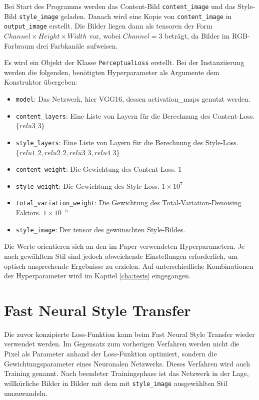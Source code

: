Bei Start des Programms werden das Content-Bild \texttt{content_image} und das Style-Bild \texttt{style_image} geladen. Danach wird eine Kopie von \texttt{content_image} in \texttt{output_image} erstellt. Die Bilder liegen dann als \gls{tensor}en der Form $ Channel \times Height \times Width $ vor, wobei $ Channel = 3 $ beträgt, da Bilder im RGB-Farbraum drei Farbkanäle aufweisen.

Es wird ein Objekt der Klasse \texttt{PerceptualLoss} erstellt. Bei der Instanziierung werden die folgenden, benötigten Hyperparameter als Argumente dem Konstruktor übergeben:

\begin{itemize}
	\item \texttt{model}: Das Netzwerk, hier VGG16, dessen \gls{activation_map}s genutzt werden.
	\item \texttt{content_layers}: Eine Liste von Layern für die Berechnung des Content-Loss.\\ $ \{ relu3\_3 \} $
	\item \texttt{style_layers}: Eine Liste von Layern für die Berechnung des Style-Loss.\\ $ \{ relu1\_2, relu2\_2, relu3\_3, relu4\_3 \} $
	\item \texttt{content_weight}: Die Gewichtung des Content-Loss. $ 1 $ 
	\item \texttt{style_weight}: Die Gewichtung des Style-Loss. $ 1 \times 10^{7} $
	\item \texttt{total_variation_weight}: Die Gewichtung des Total-Variation-Denoising Faktors. $ 1 \times 10^{-5} $
	\item \texttt{style_image}: Der \gls{tensor} des gewünschten Style-Bildes.
\end{itemize}

Die Werte orientieren sich an den im Paper \cite{DBLP:journals/corr/JohnsonAL16} verwendeten Hyperparametern. Je nach gewähltem Stil sind jedoch abweichende Einstellungen erforderlich, um optisch ansprechende Ergebnisse zu erzielen. Auf unterschiedliche Kombinationen der Hyperparameter wird im Kapitel \ref{cha:tests} eingegangen.

\section{Fast Neural Style Transfer}

Die zuvor konzipierte Loss-Funktion kann beim Fast Neural Style Transfer wieder verwendet werden. 
Im Gegensatz zum vorherigen Verfahren werden nicht die Pixel als Parameter anhand der Loss-Funktion optimiert, sondern die Gewichtungsparameter eines Neuronalen Netzwerks. Dieses Verfahren wird auch Training genannt. Nach beendeter Trainingsphase ist das Netzwerk in der Lage, willkürliche Bilder in Bilder mit dem mit \texttt{style_image} ausgewählten Stil umzuwandeln.

